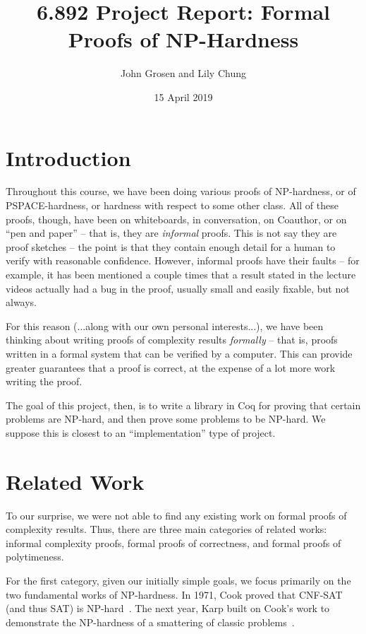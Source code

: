 \documentclass{article}
\title{6.892 Project Report: Formal Proofs of NP-Hardness}
\author{John Grosen and Lily Chung}
\date{15 April 2019}
\begin{document}
\maketitle

\section{Introduction}

Throughout this course, we have been doing various proofs of NP-hardness, or of
PSPACE-hardness, or hardness with respect to some other class. All of these
proofs, though, have been on whiteboards, in conversation, on Coauthor, or on
``pen and paper'' -- that is, they are \emph{informal} proofs. This is not say
they are proof sketches -- the point is that they contain enough detail for a
human to verify with reasonable confidence. However, informal proofs have their
faults -- for example, it has been mentioned a couple times that a result stated
in the lecture videos actually had a bug in the proof, usually small and easily
fixable, but not always.

For this reason (...along with our own personal interests...), we have been
thinking about writing proofs of complexity results \emph{formally} -- that is,
proofs written in a formal system that can be verified by a computer. This can
provide greater guarantees that a proof is correct, at the expense of a lot more
work writing the proof.

The goal of this project, then, is to write a library in Coq for proving that
certain problems are NP-hard, and then prove some problems to be NP-hard. We
suppose this is closest to an ``implementation'' type of project.

\section{Related Work}

To our surprise, we were not able to find any existing work on formal proofs of
complexity results. Thus, there are three main categories of related works:
informal complexity proofs, formal proofs of correctness, and formal proofs of
polytimeness.

For the first category, given our initially simple goals, we focus primarily on
the two fundamental works of NP-hardness. In 1971, Cook proved that CNF-SAT (and
thus SAT) is NP-hard~\cite{cook1971}. The next year, Karp built on Cook's work
to demonstrate the NP-hardness of a smattering of classic
problems~\cite{karp1972}.
\end{document}
